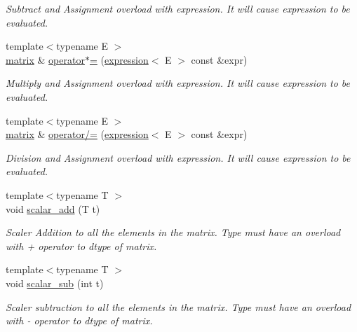 \begin{DoxyCompactItemize}
\begin{DoxyCompactList}\small\item\em Subtract and Assignment overload with expression. It will cause expression to be evaluated. \end{DoxyCompactList}\item 
{\footnotesize template$<$typename E $>$ }\\\mbox{\hyperlink{classtest_1_1matrix}{matrix}} \& \mbox{\hyperlink{classtest_1_1matrix_a693b7a5396ba6a51342a525cb6738be1}{operator$\ast$=}} (\mbox{\hyperlink{classtest_1_1expression}{expression}}$<$ E $>$ const \&expr)
\begin{DoxyCompactList}\small\item\em Multiply and Assignment overload with expression. It will cause expression to be evaluated. \end{DoxyCompactList}\item 
{\footnotesize template$<$typename E $>$ }\\\mbox{\hyperlink{classtest_1_1matrix}{matrix}} \& \mbox{\hyperlink{classtest_1_1matrix_af775ea504d511a5bd706c510b428a832}{operator/=}} (\mbox{\hyperlink{classtest_1_1expression}{expression}}$<$ E $>$ const \&expr)
\begin{DoxyCompactList}\small\item\em Division and Assignment overload with expression. It will cause expression to be evaluated. \end{DoxyCompactList}\item 
{\footnotesize template$<$typename T $>$ }\\void \mbox{\hyperlink{classtest_1_1matrix_a0bb59ea5c15a548758863aa46b291219}{scalar\+\_\+add}} (T t)
\begin{DoxyCompactList}\small\item\em Scaler Addition to all the elements in the matrix. Type must have an overload with + operator to dtype of matrix. \end{DoxyCompactList}\item 
{\footnotesize template$<$typename T $>$ }\\void \mbox{\hyperlink{classtest_1_1matrix_a65df8dc2b0c24cdc45e6063e9a779784}{scalar\+\_\+sub}} (int t)
\begin{DoxyCompactList}\small\item\em Scaler subtraction to all the elements in the matrix. Type must have an overload with -\/ operator to dtype of matrix. \end{DoxyCompactList}\item 

\end{DoxyCompactItemize}
